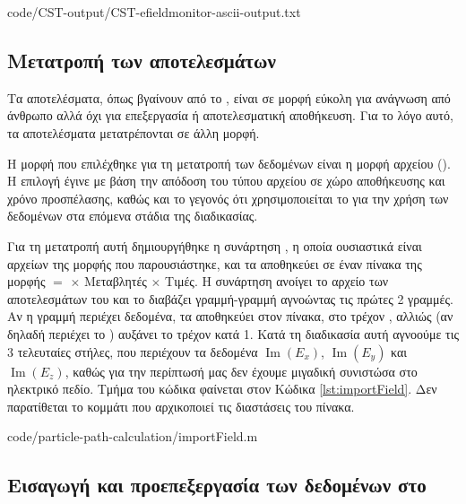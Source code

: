 
{code/CST-output/CST-efieldmonitor-ascii-output.txt}

\subsection{Μετατροπή των αποτελεσμάτων}

Τα αποτελέσματα, όπως βγαίνουν από το , είναι σε μορφή εύκολη για ανάγνωση από άνθρωπο αλλά όχι για επεξεργασία ή αποτελεσματική αποθήκευση. 
Για το λόγο αυτό, τα αποτελέσματα μετατρέπονται σε άλλη μορφή. 

Η μορφή που επιλέχθηκε για τη μετατροπή των δεδομένων είναι η μορφή αρχείου  ().
Η επιλογή έγινε με βάση την απόδοση του τύπου αρχείου σε χώρο αποθήκευσης και χρόνο προσπέλασης, καθώς και το γεγονός ότι χρησιμοποιείται το  για την χρήση των δεδομένων στα επόμενα στάδια της διαδικασίας.

Για τη μετατροπή αυτή δημιουργήθηκε η συνάρτηση , η οποία ουσιαστικά είναι  αρχείων της μορφής που παρουσιάστηκε, και τα αποθηκεύει σε έναν πίνακα της μορφής  $=$  $\times$ Μεταβλητές $\times$ Τιμές.
Η συνάρτηση ανοίγει το αρχείο των αποτελεσμάτων του  και το διαβάζει γραμμή-γραμμή αγνοώντας τις πρώτες 2 γραμμές. 
Αν η γραμμή περιέχει δεδομένα, τα αποθηκεύει στον πίνακα, στο τρέχον , αλλιώς (αν δηλαδή περιέχει το  ) αυξάνει το τρέχον  κατά 1. 
Κατά τη διαδικασία αυτή αγνοούμε τις 3 τελευταίες στήλες, που περιέχουν τα δεδομένα $\operatorname{Im}(E_x)$, $\operatorname{Im}(E_y)$ και $\operatorname{Im}(E_z)$, καθώς για την περίπτωσή μας δεν έχουμε μιγαδική συνιστώσα στο ηλεκτρικό πεδίο.
Τμήμα του κώδικα φαίνεται στον Κώδικα \ref{lst:importField}. 
Δεν παρατίθεται το κομμάτι που αρχικοποιεί τις διαστάσεις του πίνακα.


{code/particle-path-calculation/importField.m}

\subsection{Εισαγωγή και προεπεξεργασία των δεδομένων στο }

